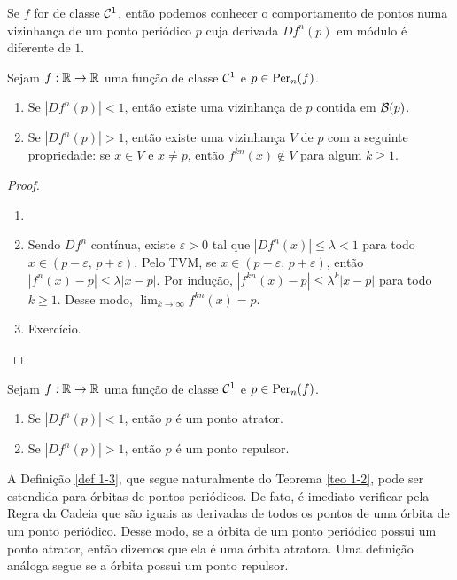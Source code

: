 Se $f$ for de classe $\mathcal{C}^1$, então podemos conhecer o comportamento de pontos numa vizinhança de um ponto periódico $p$ cuja derivada $Df^n(p)$ em módulo é diferente de $1$.

\begin{theorem}\label{teo 1-2}
Sejam $f: \mathbb{R} \to \mathbb{R}$ uma função de classe $\mathcal{C}^1$ e $p \in \operatorname{Per}_n(f)$.
\begin{enumerate}
\item Se $|D f^n(p)| < 1$, então existe uma vizinhança de $p$ contida em $\mathcal{B}(p)$.
\item Se $|D f^n(p)| > 1$, então existe uma vizinhança $V$ de $p$ com a seguinte propriedade: se $x \in V$ e $x \neq p$, então  $f^{kn}(x) \notin V$ para algum $k \geq 1$. 
\end{enumerate}
\end{theorem}

\begin{proof}
\begin{enumerate}\item[]
\item Sendo $D f^n$ contínua, existe $\varepsilon > 0$ tal que $|D f^n(x)| \leq \lambda < 1$ para todo $x \in (p - \varepsilon,\, p + \varepsilon)$. Pelo TVM, se $x \in (p - \varepsilon,\, p + \varepsilon)$, então $|f^n(x) - p| \leq \lambda|x - p|$. Por indução, $|f^{kn}(x) - p| \leq \lambda^k|x - p|$ para todo $k \geq 1$. Desse modo, $\lim_{k \to \infty} f^{kn}(x) = p$.
\item Exercício.
\end{enumerate}
\end{proof}

\begin{definition}\label{def 1-3}
Sejam $f: \mathbb{R} \to \mathbb{R}$ uma função de classe $\mathcal{C}^1$ e $p \in \operatorname{Per}_n(f)$.
\begin{enumerate}[label=\roman*.]
\item Se $|D f^n(p)| < 1$, então $p$ é um ponto atrator.
\item Se $|D f^n(p)| > 1$, então $p$ é um ponto repulsor.
\end{enumerate}
\end{definition}

A Definição \ref{def 1-3}, que segue naturalmente do Teorema \ref{teo 1-2}, pode ser estendida para órbitas de pontos periódicos. De fato, é imediato verificar pela Regra da Cadeia que são iguais as derivadas de todos os pontos de uma órbita de um ponto periódico. Desse modo, se a órbita de um ponto periódico possui um ponto atrator, então dizemos que ela é uma órbita atratora. Uma definição análoga segue se a órbita possui um ponto repulsor.